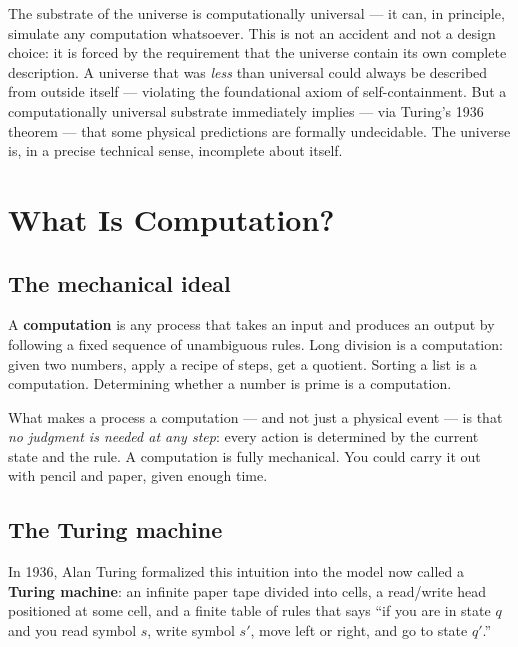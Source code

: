 \documentclass[11pt,a4paper]{article}
\newcommand{\term}[1]{\textbf{#1}}
\begin{document}
\bigskip
\begin{tcolorbox}[colback=boxpurple,colframe=purple!50!black,title=\textbf{The Central Claim}]
The substrate of the universe is computationally universal — it can, in principle,
simulate any computation whatsoever.  This is not an accident and not a design choice:
it is forced by the requirement that the universe contain its own complete description.
A universe that was \emph{less} than universal could always be described from outside
itself — violating the foundational axiom of self-containment.  But a computationally
universal substrate immediately implies — via Turing's 1936 theorem — that some physical
predictions are formally undecidable.  The universe is, in a precise technical sense,
incomplete about itself.
\end{tcolorbox}

\section{What Is Computation?}

\subsection{The mechanical ideal}

A \term{computation} is any process that takes an input and produces an output by
following a fixed sequence of unambiguous rules.  Long division is a computation: given
two numbers, apply a recipe of steps, get a quotient.  Sorting a list is a computation.
Determining whether a number is prime is a computation.

What makes a process a computation — and not just a physical event — is that
\emph{no judgment is needed at any step}: every action is determined by the current
state and the rule.  A computation is fully mechanical.  You could carry it out with
pencil and paper, given enough time.

\subsection{The Turing machine}

In 1936, Alan Turing formalized this intuition into the model now called a
\term{Turing machine}: an infinite paper tape divided into cells, a read/write head
positioned at some cell, and a finite table of rules that says ``if you are in state $q$
and you read symbol $s$, write symbol $s'$, move left or right, and go to state $q'$.''
\end{document}

